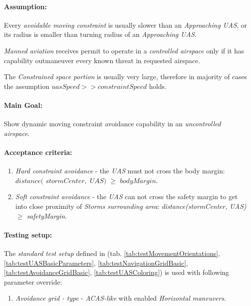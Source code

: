     \paragraph{Assumption:} Every \emph{avoidable moving constraint} is usually slower than an \emph{Approaching UAS}, or its radius is smaller than turning radius of an \emph{Approaching UAS}.
    
    \begin{note}
    \emph{Manned aviation} receives permit to operate in a \emph{controlled airspace} only if it has capability outmaneuver every known threat in requested airspace. 
    
    The \emph{Constrained space portion} is usually very large, therefore in majority of cases the assumption $uasSpeed >> constraintSpeed$  holds.
    \end{note}
 
    \paragraph{Main Goal:} Show dynamic moving constraint avoidance capability in an \emph{uncontrolled airspace}.
    
    \paragraph{Acceptance criteria:}
    \begin{enumerate}
        \item \emph{Hard constraint avoidance} - the \emph{UAS} must not cross the body margin:  $distance($ $stormCenter,$ $UAS)$ $\ge$  $bodyMargin$.
        \item \emph{Soft constraint avoidance} - the \emph{UAS} can not cross the safety margin to get into close proximity of \emph{Storms surrounding area}: \emph{distance(stormCenter, UAS)} $\ge$ \emph{safetyMargin}. 
    \end{enumerate}
    
    \paragraph{Testing setup:} The \emph{standard test setup} defined in (tab. \ref{tab:testMovementOrientations}, \ref{tab:testUASBasicParameters}, \ref{tab:testNavigationGridBasic}, \ref{tab:testAvoidanceGridBasic}, \ref{tab:testUASColoring}) is used with following parameter override:
    \begin{enumerate}
        \item \emph{Avoidance grid - type} - \emph{ACAS-like} with enabled \emph{Horizontal maneuvers}.
    \end{enumerate}
    
